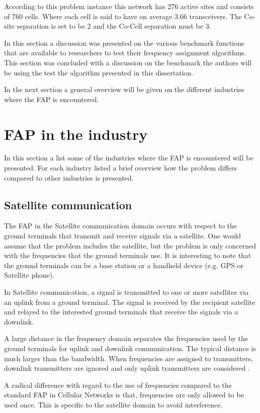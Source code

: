 According to this problem instance this network has 276 active sites and consists of 760 cells. Where each cell is said to have on average 3.66 transceivers. The Co-site separation is set to be 2 and the Co-Cell separation must be 3.

In this section a discussion was presented on the various benchmark functions that are available to researchers to test their frequency assignment algorithms. This section was concluded with a discussion on the benchmark the authors will be using the test the algorithm presented in this dissertation.

In the next section a general overview will be given on the different industries where the FAP is encountered.
\section{FAP in the industry}
\label{sec:FAPIndustry}
In this section a list some of the industries where the FAP is encountered will be presented. For each industry listed a brief overview how the problem differs compared to other industries is presented. 

\subsection{Satellite communication}
The FAP in the Satellite communication domain occurs with respect to the ground terminals that transmit and receive signals via a satellite. One would assume that the problem includes the satellite, but the problem is only concerned with the frequencies that the ground terminals use. It is interesting to note that the ground terminals can be a base station or a handheld device (e.g. GPS or Satellite phone).

In Satellite communication, a signal is transmitted to one or more satellites via an uplink from a ground terminal. The signal is received by the recipient satellite and relayed to the interested ground terminals that receive the signals via a downlink.

 A large distance in the frequency domain separates the frequencies used by the ground terminals for uplink and downlink communication. The typical distance is much larger than the bandwidth. When frequencies are assigned to transmitters, downlink transmitters are ignored and only uplink transmitters are considered \cite{Karen2004}. 

A radical difference with regard to the use of frequencies compared to the standard FAP in Cellular Networks is that, frequencies are only allowed to be used once. This is specific to the satellite domain to avoid interference\cite{Karen2004}.

